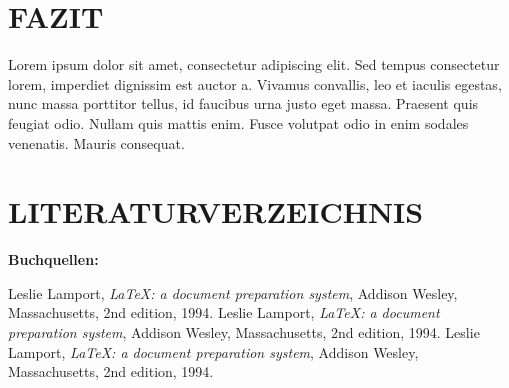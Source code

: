 \documentclass[a4paper,12pt]{article}
\begin{document}

\newpage
\section{FAZIT}
Lorem ipsum dolor sit amet, consectetur adipiscing elit. Sed tempus consectetur lorem, imperdiet dignissim est auctor a. Vivamus convallis, leo et iaculis egestas, nunc massa porttitor tellus, id faucibus urna justo eget massa. Praesent quis feugiat odio. Nullam quis mattis enim. Fusce volutpat odio in enim sodales venenatis. Mauris consequat.



\newpage
\section{LITERATURVERZEICHNIS}

\begingroup
\renewcommand{\section}[2]{}%
\begin{large}
\textbf{Buchquellen:}
\end{large}

\begin{thebibliography}{9}

      Leslie Lamport,
      \textit{\LaTeX: a document preparation system},
      Addison Wesley, Massachusetts,
      2nd edition,
      1994.
      Leslie Lamport,
      \textit{\LaTeX: a document preparation system},
      Addison Wesley, Massachusetts,
      2nd edition,
      1994.
      Leslie Lamport,
      \textit{\LaTeX: a document preparation system},
      Addison Wesley, Massachusetts,
      2nd edition,
      1994.

\end{thebibliography}

\vspace{1cm}
\end{document}
